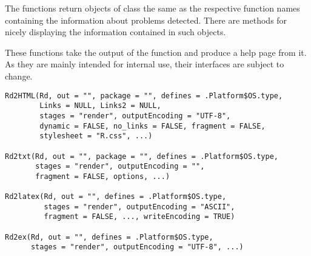 %
\begin{Value}
The functions return objects of class the same as the respective
function names containing the information about problems detected.
There are  methods for nicely displaying the information
contained in such objects.
\end{Value}
%
\begin{Description}\relax
These functions take the output of the  function
and produce a help page from it.  As they are mainly
intended for internal use, their interfaces are subject to change.
\end{Description}
%
\begin{Usage}
\begin{verbatim}
Rd2HTML(Rd, out = "", package = "", defines = .Platform$OS.type,
        Links = NULL, Links2 = NULL,
        stages = "render", outputEncoding = "UTF-8", 
        dynamic = FALSE, no_links = FALSE, fragment = FALSE,
        stylesheet = "R.css", ...)

Rd2txt(Rd, out = "", package = "", defines = .Platform$OS.type,
       stages = "render", outputEncoding = "",
       fragment = FALSE, options, ...)

Rd2latex(Rd, out = "", defines = .Platform$OS.type,
         stages = "render", outputEncoding = "ASCII",
         fragment = FALSE, ..., writeEncoding = TRUE)

Rd2ex(Rd, out = "", defines = .Platform$OS.type,
      stages = "render", outputEncoding = "UTF-8", ...)
\end{verbatim}
\end{Usage}
%
